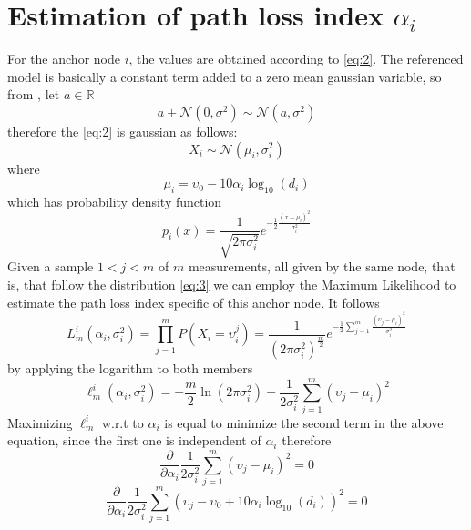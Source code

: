 \documentclass[12pt,twoside]{report}
\begin{document}
\iffalse
\section{Estimation of path loss index $\alpha_i$}
For the anchor node $i$, the values are obtained according to \ref{eq:2}. The referenced model is basically a constant term added to a zero mean gaussian variable, so from \cite{alma9926534668905776}, let $a \in \mathbb{R}$
\begin{equation}
a+\mathcal{N}(0,\sigma^2)\sim\mathcal{N}(a,\sigma^2)
\end{equation} therefore the \ref{eq:2} is gaussian as follows:
\begin{equation}
    X_i\sim \mathcal{N}(\mu_i,\sigma^2_i)
    \label{eq:3}
\end{equation}
where 
\begin{equation}
    \mu_i = \upsilon_0-10\alpha_i\log_{10}(d_i)
\end{equation}
which has probability density function
\begin{equation}
    p_i(x)=\frac{1}{\sqrt{2\pi\sigma_i^2}}e^{-\frac{1}{2}\frac{(x-\mu_i)^2}{\sigma^2_i}}
\end{equation} 
Given a sample $1<j<m$ of $m$ measurements, all given by the same node, that is, that follow the distribution \ref{eq:3} we can employ the Maximum Likelihood to estimate the path loss index specific of this anchor node. It follows
\begin{equation}
    L_m^i(\alpha_i,\sigma_i^2)=\prod_{j=1}^mP(X_i=\upsilon_i^j)=
    \frac{1}{(2\pi\sigma_i^2)^{\frac{m}{2}}}e^{-\frac{1}{2}\sum_{j=1}^m\frac{(\upsilon_j-\mu_i)^2}{\sigma^2_i}}
\end{equation}
by applying the logarithm to both members
\begin{equation}
    \ell_m^i(\alpha_i,\sigma^2_i)=-\frac{m}{2}\ln(2\pi\sigma^2_i)-\frac{1}{2\sigma^2_i}\sum_{j=1}^m(\upsilon_j-\mu_i)^2
    \label{eq:4}
\end{equation}
Maximizing $\ell_m^i$ w.r.t to $\alpha_i$ is equal to minimize the second term in the above equation, since the first one is independent of $\alpha_i$ therefore \cite{MUNOZ200923} 
\begin{equation}
\frac{\partial}{\partial \alpha_i} \frac{1}{2\sigma^2_i}\sum_{j=1}^m(\upsilon_j-\mu_i)^2 =0
\end{equation}
\begin{equation}
\frac{\partial}{\partial \alpha_i} \frac{1}{2\sigma^2_i}\sum_{j=1}^m(\upsilon_j-\upsilon_0+10\alpha_i\log_{10}(d_i))^2 =0
\end{equation}
\end{document}
